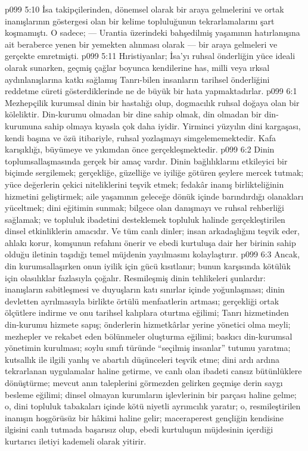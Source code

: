 \vs p099 5:10 İsa takipçilerinden, dönemsel olarak bir araya gelmelerini ve ortak inanışlarının göstergesi olan bir kelime topluluğunun tekrarlamalarını şart koşmamıştı. O sadece; --- Urantia üzerindeki bahşedilmiş yaşamının hatırlanışına ait beraberce yenen bir yemekten alınması olarak --- bir araya gelmeleri ve gerçekte emretmişti.
\vs p099 5:11 Hıristiyanlar; İsa’yı ruhsal önderliğin yüce ideali olarak sunarken, geçmiş çağlar boyunca kendilerine has, milli veya ırksal aydınlanışlarına katkı sağlamış Tanrı\hyp{}bilen insanların tarihsel önderliğini reddetme cüreti gösterdiklerinde ne de büyük bir hata yapmaktadırlar.
\vs p099 6:1 Mezhepçilik kurumsal dinin bir hastalığı olup, dogmacılık ruhsal doğaya olan bir köleliktir. Din\hyp{}kurumu olmadan bir dine sahip olmak, din olmadan bir din\hyp{}kurumuna sahip olmaya kıyasla çok daha iyidir. Yirminci yüzyılın dini kargaşası, kendi başına ve özü itibariyle, ruhsal yozlaşmayı simgelememektedir. Kafa karışıklığı, büyümeye ve yıkımdan önce gerçekleşmektedir.
\vs p099 6:2 Dinin toplumsallaşmasında gerçek bir amaç vardır. Dinin bağlılıklarını etkileyici bir biçimde sergilemek; gerçekliğe, güzelliğe ve iyiliğe götüren şeylere mercek tutmak; yüce değerlerin çekici niteliklerini teşvik etmek; fedakâr inanış birlikteliğinin hizmetini geliştirmek; aile yaşamının geleceğe dönük içinde barındırdığı olanakları yüceltmek; dini eğitimin sunmak; bilgece olan danışmayı ve ruhsal rehberliği sağlamak; ve topluluk ibadetini desteklemek topluluk halinde gerçekleştirilen dinsel etkinliklerin amacıdır. Ve tüm canlı dinler; insan arkadaşlığını teşvik eder, ahlakı korur, komşunun refahını önerir ve ebedi kurtuluşa dair her birinin sahip olduğu iletinin taşıdığı temel müjdenin yayılmasını kolaylaştırır.
\vs p099 6:3 Ancak, din kurumsallaşırken onun iyilik için gücü kısıtlanır; bunun karşısında kötülük için olasılıklar fazlasıyla çoğalır. Resmileşmiş dinin tehlikeleri şunlardır: inanışların sabitleşmesi ve duyuşların katı sınırlar içinde yoğunlaşması; dinin devletten ayrılmasıyla birlikte örtülü menfaatlerin artması; gerçekliği ortak ölçütlere indirme ve onu tarihsel kalıplara oturtma eğilimi; Tanrı hizmetinden din\hyp{}kurumu hizmete sapış; önderlerin hizmetkârlar yerine yönetici olma meyli; mezhepler ve rekabet eden bölünmeler oluşturma eğilimi; baskıcı din\hyp{}kurumsal yönetimin kurulması; soylu sınıfı türünde “seçilmiş insanlar” tutumu yaratma; kutsallık ile ilgili yanlış ve abartılı düşünceleri teşvik etme; dini ardı ardına tekrarlanan uygulamalar haline getirme, ve canlı olan ibadeti cansız bütünlüklere dönüştürme; mevcut anın taleplerini görmezden gelirken geçmişe derin saygı besleme eğilimi; dinsel olmayan kurumların işlevlerinin bir parçası haline gelme; o, dini topluluk tabakaları içinde kötü niyetli ayrımcılık yaratır; o, resmileştirilen inanışın hoşgörüsüz bir hâkimi haline gelir; maceraperest gençliğin kendisine ilgisini canlı tutmada başarısız olup, ebedi kurtuluşun müjdesinin içerdiği kurtarıcı iletiyi kademeli olarak yitirir.
